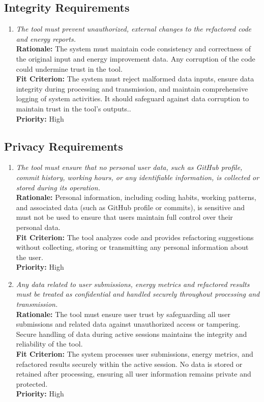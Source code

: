 \documentclass[12pt]{article}
\begin{document}
\subsection{Integrity Requirements}
\begin{enumerate}[label=SR-IR \arabic*., wide=0pt, leftmargin=*]
  \item \emph{The tool must prevent unauthorized, external changes to
    the refactored code and energy reports.}\\[2mm]
    {\bf Rationale:} The system must maintain code consistency and
    correctness of the original input and energy improvement data.
    Any corruption of the code could undermine trust in the tool.\\
    {\bf Fit Criterion:} The system must reject malformed data
    inputs, ensure data integrity during processing and transmission,
    and maintain comprehensive logging of system activities. It
    should safeguard against data corruption to maintain trust in the
    tool's outputs..\\
    {\bf Priority:} High
\end{enumerate}
\subsection{Privacy Requirements}
\begin{enumerate}[label=SR-PR \arabic*., wide=0pt, leftmargin=*]
  \item \emph{The tool must ensure that no personal user data, such
      as GitHub profile, commit history, working hours, or any
      identifiable information, is collected or stored during its
    operation. }\\[2mm]
    {\bf Rationale:} Personal information, including coding habits,
    working patterns, and associated data (such as GitHub profile or
    commits), is sensitive and must not be used to ensure that users
    maintain full control over their personal data.\\
    {\bf Fit Criterion:} The tool analyzes code and provides
    refactoring suggestions without collecting, storing or
    transmitting any personal information about the user.\\
    {\bf Priority:} High
  \item \emph{Any data related to user submissions, energy metrics
      and refactored results must be treated as confidential and
    handled securely throughout processing and transmission.}\\
    {\bf Rationale:} The tool must ensure user trust by safeguarding
    all user submissions and related data against unauthorized access
    or tampering. Secure handling of data during active sessions
    maintains the integrity and reliability of the tool. \\
    {\bf Fit Criterion:} The system processes user submissions,
    energy metrics, and refactored results securely within the active
    session. No data is stored or retained after processing, ensuring
    all user information remains private and protected.\\
    {\bf Priority:} High
\end{enumerate}
\end{document}
